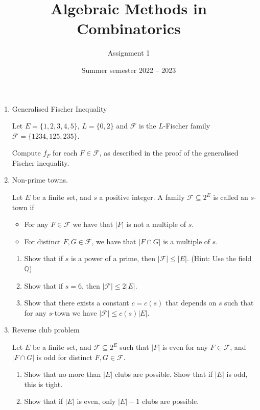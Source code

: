 \documentclass[kulak]{tplt}
\title{Algebraic Methods in Combinatorics}
\author{Assignment 1}
\date{Summer semester 2022 -- 2023}
\theoremstyle{definition}
\newcommand{\Q}{\mathbb{Q}}
\newcommand{\FF}{\mathcal F}
\begin{document}
\maketitle
\begin{enumerate}
\item Generalised Fischer Inequality

Let $E = \{1, 2, 3, 4, 5\}$, $L =\{0, 2\}$ and $\FF $ is the $L$-Fischer family $\FF = \{1234, 125, 235\}$.

Compute $f_F$ for each $F\in \FF$, as described in the proof of the generalised Fischer inequality.


\item Non-prime towns.

Let $E$ be a finite set, and $s$ a positive integer.
A family $\FF \subseteq 2^E$ is called an $s$-town if 
\begin{itemize}
\item For any $F \in \FF$ we have that $|F|$ is not a multiple of $s$.

\item For distinct $F,  G \in \FF$, we have that $|F\cap G|$ is a multiple of $s$.
\end{itemize}

\begin{enumerate}
\item Show that if $s$ is a power of a prime, then $|\FF| \leq |E|$.
(Hint: Use the field $\Q$)

\item Show that if $s = 6$, then $|\FF| \leq 2 |E|$.

\item Show that there exists a constant $c = c(s)$ that depends on $s$ such that for any $s$-town we have $|\FF| \leq c(s) |E|$.
\end{enumerate}



\item Reverse club problem

Let $E$ be a finite set, and $\FF \subseteq 2^E$ such that $|F|$ is even for any $F\in \FF$, and $|F\cap G|$ is odd for distinct $F, G \in \FF$.


\begin{enumerate}

\item Show that no more than $|E|$ clubs are possible. 
Show that if $|E|$ is odd, this is tight.

\item Show that if $|E|$ is even, only $|E| - 1$ clubs are possible.
\end{enumerate}


\end{enumerate}
\end{document}
